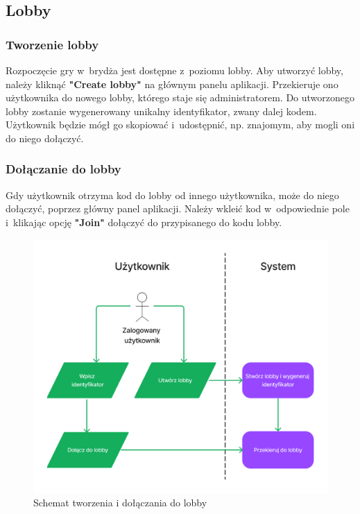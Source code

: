 \FloatBarrier

\subsection{Lobby}
\subsubsection{Tworzenie lobby}

Rozpoczęcie gry w~brydża jest dostępne z~poziomu lobby. Aby utworzyć
lobby, należy kliknąć \textbf{"Create lobby"} na głównym panelu
aplikacji. Przekieruje ono użytkownika do nowego lobby, którego staje
się administratorem. Do utworzonego lobby zostanie wygenerowany
unikalny identyfikator, zwany dalej kodem. Użytkownik będzie mógł go skopiować
i~udostępnić, np. znajomym, aby mogli oni do niego dołączyć.

\subsubsection{Dołączanie do lobby}

Gdy użytkownik otrzyma kod do lobby od innego użytkownika, może
do niego dołączyć, poprzez główny panel aplikacji. Należy wkleić
kod w~odpowiednie pole i~klikając opcję \textbf{"Join"}
dołączyć do przypisanego do kodu lobby.

\begin{figure}[h]
  \centering
  \includegraphics[width=\textwidth]{img/schematy/create_join_lobby.png}
  \caption{Schemat tworzenia i dołączania do lobby}
\end{figure}

